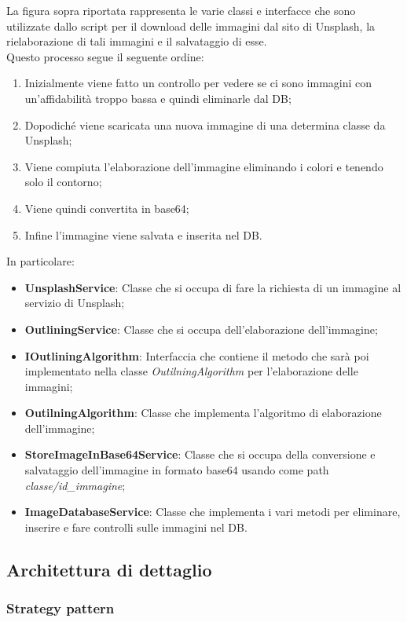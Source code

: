 La figura sopra riportata rappresenta le varie classi e interfacce che sono utilizzate dallo script per il download delle immagini dal sito di Unsplash, la rielaborazione di tali immagini e il salvataggio di esse.\\ Questo processo segue il seguente ordine:
\begin{enumerate}
	\item Inizialmente viene fatto un controllo per vedere se ci sono immagini con un'affidabilità troppo bassa e quindi eliminarle dal DB;
    \item Dopodiché viene scaricata una nuova immagine di una determina classe da Unsplash;
    \item Viene compiuta l'elaborazione dell'immagine eliminando i colori e tenendo solo il contorno;
    \item Viene quindi convertita in base64;
    \item Infine l'immagine viene salvata e inserita nel DB.
\end{enumerate}

In particolare:
\begin{itemize}
    \item \textbf{UnsplashService}: Classe che si occupa di fare la richiesta di un immagine al servizio di Unsplash;
    \item \textbf{OutliningService}: Classe che si occupa dell'elaborazione dell'immagine;
    \item \textbf{IOutliningAlgorithm}: Interfaccia che contiene il metodo che sarà poi implementato nella classe \textit{OutilningAlgorithm} per l'elaborazione delle immagini;
    \item \textbf{OutilningAlgorithm}: Classe che implementa l'algoritmo di elaborazione dell'immagine;
    \item \textbf{StoreImageInBase64Service}: Classe che si occupa della conversione e salvataggio dell'immagine in formato base64 usando come path \textit{classe/id\_immagine};
    \item \textbf{ImageDatabaseService}: Classe che implementa i vari metodi per eliminare, inserire e fare controlli sulle immagini nel DB.
\end{itemize}
\newpage
\subsection{Architettura di dettaglio}

\subsubsection{Strategy pattern}

